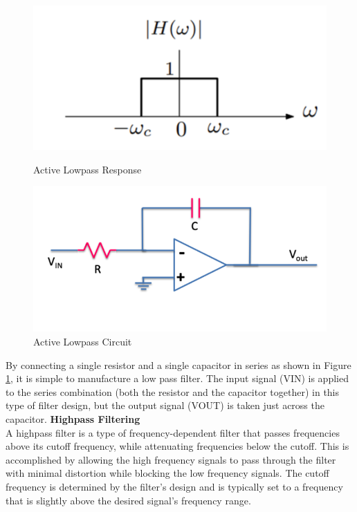 \documentclass[12pt,a4paper]{article}
\begin{document}
				\begin{figure}[H]
					\begin{center}
						\includegraphics[width=0.6\linewidth]{Lowpass}
							\caption{Active Lowpass Response}
						\includegraphics[width=0.6\linewidth]{Lowpass_circuit}
							\caption{Active Lowpass Circuit}
							\label{fig:LOWPASS_CIRCUIT}
					\end{center}
				\end{figure}
By connecting a single resistor and a single capacitor in series as shown in Figure \ref{fig:LOWPASS_CIRCUIT}, it is simple to manufacture a low pass filter. The input signal (VIN) is applied to the series combination (both the resistor and the capacitor together) in this type of filter design, but the output signal (VOUT) is taken just across the capacitor.				
\newpage
\vspace*{5mm}
			\textbf{Highpass Filtering}\\
				A highpass filter is a type of frequency-dependent filter that passes frequencies above its cutoff frequency, while attenuating frequencies below the cutoff. This is accomplished
				by allowing the high frequency signals to pass through the filter with minimal distortion while blocking the low frequency signals. The cutoff frequency is determined by the filter's
				design and is typically set to a frequency that is slightly above the desired signal's frequency range.
\end{document}
